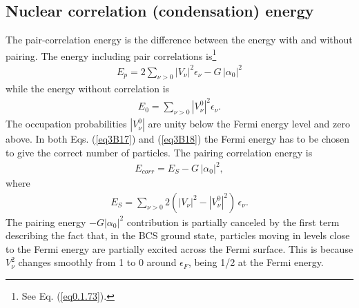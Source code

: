 \subsection{Nuclear correlation (condensation) energy}\label{App3B4}
The pair-correlation energy is the difference between the energy with and without pairing. The energy including pair correlations is\footnote{See Eq. (\ref{eq0.1.73}).}
 \begin{align}\label{eq3B17}
E_p=2\sum_{\nu>0}|V_\nu|^2\epsilon_\nu-G\,|\alpha_0|^2
 \end{align} 
 while the energy without correlation is
  \begin{align}\label{eq3B18}
  E_0=\sum_{\nu>0}|V^0_\nu|^2\epsilon_\nu.
  \end{align} 
 The occupation probabilities $|V^0_\nu|$ are unity below the Fermi energy level and zero above. In both Eqs. (\ref{eq3B17}) and (\ref{eq3B18}) the Fermi energy has to be chosen to give the correct number of particles. The pairing correlation energy is 
   \begin{align}\label{eq3B19}
E_{corr}=E_S-G\,|\alpha_0|^2,
   \end{align} 
 where
   \begin{align}\label{eq3B20}
E_S=\sum_{\nu>0}2(|V_\nu|^2-|V^0_\nu|^2)\,\epsilon_\nu.
   \end{align}  
 The  pairing energy $-G|\alpha_0|^2$ contribution is partially canceled by the first term describing the fact that, in the BCS ground state, particles moving in levels close to the Fermi energy are partially excited across the Fermi surface. This is because $V_\nu^2$ changes smoothly from 1 to 0 around $\epsilon_F$, being 1/2 at the Fermi energy.
 

